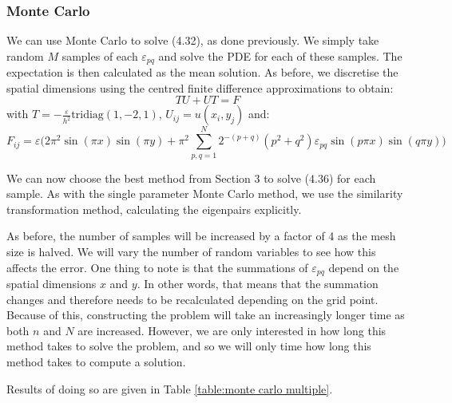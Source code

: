\documentclass[11pt]{article}
\numberwithin{equation}{section}
\begin{document}
\subsubsection{Monte Carlo}
We can use Monte Carlo to solve (4.32), as done previously. We simply take random $M$ samples of each $\varepsilon_{pq}$ and solve the PDE for each of these samples. The expectation is then calculated as the mean solution. As before, we discretise the spatial dimensions using the centred finite difference approximations to obtain:
\begin{equation}
TU + UT = F
\end{equation}
with $T= -\frac{\varepsilon}{h^2}\text{tridiag}(1,-2,1)$, $U_{ij} = u(x_i,y_j)$ and: 
\[F_{ij}=\varepsilon \Big(2\pi^2 \sin(\pi x) \sin(\pi y) + \pi^2 \sum_{p,q=1}^N 2^{-(p+q)} (p^2 + q^2) \varepsilon_{pq} \sin(p \pi x)\sin(q \pi y) \Big) \]

We can now choose the best method from Section 3 to solve (4.36) for each sample. As with the single parameter Monte Carlo method, we use the similarity transformation method, calculating the eigenpairs explicitly. 

As before, the number of samples will be increased by a factor of 4 as the mesh size is halved. We will vary the number of random variables to see how this affects the error. One thing to note is that the summations of $\varepsilon_{pq}$ depend on the spatial dimensions $x$ and $y$. In other words, that means that the summation changes and therefore needs to be recalculated depending on the grid point. Because of this, constructing the problem will take an increasingly longer time as both $n$ and $N$ are increased. However, we are only interested in how long this method takes to solve the problem, and so we will only time how long this method takes to compute a solution. 

Results of doing so are given in Table \ref{table:monte carlo multiple}.
\end{document}
